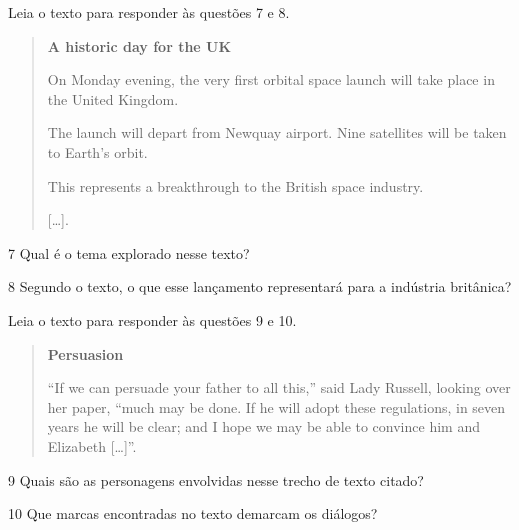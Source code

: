 \pagebreak

Leia o texto para responder às questões 7 e 8.

\begin{quote}
\textbf{A historic day for the UK}

On Monday evening, the very first orbital space launch will take place in the United Kingdom.

The launch will depart from Newquay airport. Nine satellites will be taken to Earth’s orbit.

This represents a breakthrough to the British space industry.

{[}\ldots{}{]}.

\end{quote}

\num{7} Qual é o tema explorado nesse texto?



\num{8} Segundo o texto, o que esse lançamento representará para a indústria britânica?



Leia o texto para responder às questões 9 e 10.

\begin{quote}
\textbf{Persuasion}

``If we can persuade your father to all this,'' said Lady Russell,
looking over her paper, ``much may be done. If he will adopt these
regulations, in seven years he will be clear; and I hope we may be able
to convince him and Elizabeth {[}\ldots{}{]}''.

\end{quote}

\num{9} Quais são as personagens envolvidas nesse trecho de texto citado?



\num{10} Que marcas encontradas no texto demarcam os diálogos?


